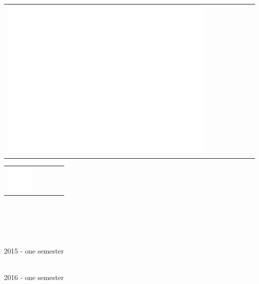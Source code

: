 \documentclass[letterpaper]{article}
\begin{document}
\begin{minipage}{1.\linewidth}
{\begin{minipage}{0.47\linewidth}
\begin{minipage}{1\linewidth}
\begin{minipage}{0.47\linewidth}
		\end{minipage}
		\hfill
		\begin{minipage}{0.47\linewidth}
			\begin{tabularx}{1\textwidth}{rX}
			\includegraphics[width=0.1\linewidth]{code.eps} & 
			\Large\textmd{\textcolor{white}{Development}}\\
			\end{tabularx}
			\vspace{1ex}
			\begin{tabularx}{1\textwidth}{rr}
				\includegraphics[width=0.15\linewidth]{python-48.png} & 
				\textcolor{white}{Python}
			\end{tabularx}
		\end{minipage}\\ 
	\end{minipage} %
	\begin{minipage}{1\linewidth} %
		\\
		\vspace{2ex}
		\begin{minipage}{0.9\linewidth}
			{\normalsize \textcolor{white}{Project Management @ Institut 
			Universitaire Technologique d'Orsay}}\\
			{\small\textcolor{gray!40}{2015 - one semester}}\\
		\end{minipage} 
		\begin{minipage}{0.9\linewidth}
			{\normalsize \textcolor{white}{Relational Data Bases @ Institut 
			Universitaire Technologique d'Orsay}}\\					
			{\small\textcolor{gray!40}{2016 - one semester}}\\
		\end{minipage} 
		\begin{minipage}{0.9\linewidth}

\end{minipage}
\end{minipage}
\end{minipage}}
\end{minipage}
\end{document}
